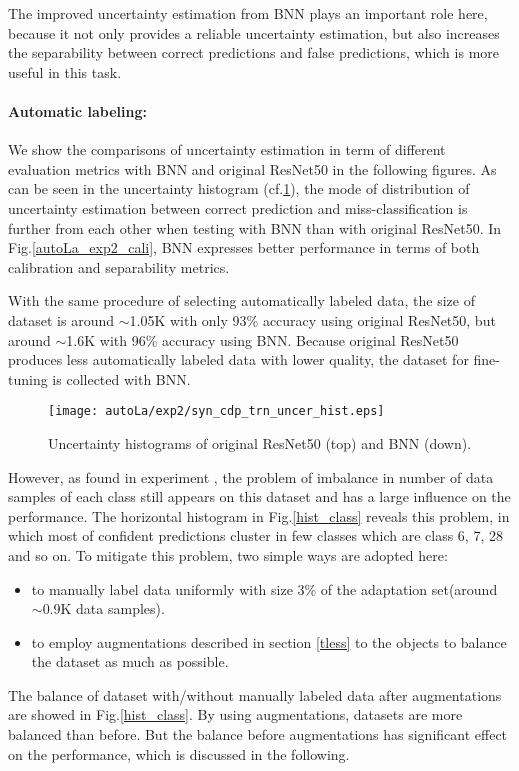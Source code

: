 The improved uncertainty estimation from BNN plays an important role here, because it not only provides a reliable uncertainty estimation, but also increases the separability between correct predictions and false predictions, which is more useful in this task. 

\paragraph{Automatic labeling:}
We show the comparisons of uncertainty estimation in term of different evaluation metrics with BNN and original ResNet50 in the following figures. As can be seen in the uncertainty histogram (cf.\ref{autoLa_exp2_hist}), the mode of distribution of uncertainty estimation between correct prediction and miss-classification is further from each other when testing with BNN than with original ResNet50. In Fig.\ref{autoLa_exp2_cali}, BNN expresses better performance in terms of both calibration and separability metrics. 

With the same procedure of selecting automatically labeled data, the size of dataset is around $\sim$1.05K with only 93\% accuracy using original ResNet50, but around $\sim$1.6K with 96\% accuracy using BNN. Because original ResNet50 produces less automatically labeled data with lower quality, the dataset for fine-tuning is collected with BNN.

\begin{figure}[H]
	\begin{center}
		\texttt{[image: autoLa/exp2/syn\_cdp\_trn\_uncer\_hist.eps]}
		\caption{Uncertainty histograms of original ResNet50 (top) and BNN (down).}		
		\label{autoLa_exp2_hist}
	\end{center}
\end{figure}


However, as found in experiment , the problem of imbalance in number of data samples of each class still appears on this dataset and has a large influence on the performance. The horizontal histogram in Fig.\ref{hist_class} reveals this problem, in which most of confident predictions cluster in few classes which are class 6, 7, 28 and so on. To mitigate this problem, two simple ways are adopted here:
\begin{itemize}
\item to manually label data uniformly with size 3\% of the adaptation set(around $\sim$0.9K data samples).
\item to employ augmentations described in section \ref{tless} to the objects to balance the dataset as much as possible.  
\end{itemize} 
The balance of dataset with/without manually labeled data after augmentations are showed in Fig.\ref{hist_class}. By using augmentations, datasets are more balanced than before. But the balance before augmentations has significant effect on the performance, which is discussed in the following.

